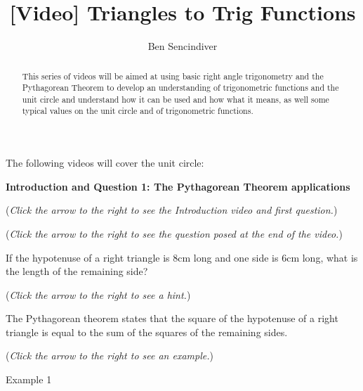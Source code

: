 \documentclass{ximera}
\title[Prerequisite Videos: ]{[Video] Triangles to Trig Functions}
\author{Ben Sencindiver}
\begin{document}
\begin{abstract}
  This series of videos will be aimed at using basic right angle trigonometry
  and the Pythagorean Theorem to develop an understanding of trigonometric
  functions and the unit circle and understand how it can be used and
  how what it means, as well some typical values on the unit circle
  and of trigonometric functions.
\end{abstract}
\maketitle

The following videos will cover the unit circle:  

\textbf{Introduction and Question 1: The Pythagorean Theorem applications}
\begin{question}
\begin{flushright}
{\color{blue}(\emph{Click the arrow to the right to see the Introduction video and first question.})}
\end{flushright}
\begin{center}
\begin{expandable}
\begin{flushright}
{\color{blue}(\emph{Click the arrow to the right to see the question
posed at the end of the video.})}
\end{flushright}
\begin{expandable}
If the hypotenuse of a right triangle is $8$cm long and one side is
$6$cm long, what is the length of the remaining side?
\begin{multipleChoice}
\end{multipleChoice}
\begin{flushright}
{\color{blue}(\emph{Click the arrow to the right to see a hint.})}
\end{flushright}
\begin{expandable}
The Pythagorean theorem states that the square of the hypotenuse
of a right triangle is equal to the sum of the squares of the remaining
sides.
\end{expandable}
\begin{flushright}
{\color{blue}(\emph{Click the arrow to the right to see an example.})}
\end{flushright}
\begin{expandable}
\begin{center}
Example 1
\end{center}
\end{expandable}
\end{expandable}
\end{expandable}
\end{center}
\end{question}
\end{document}
